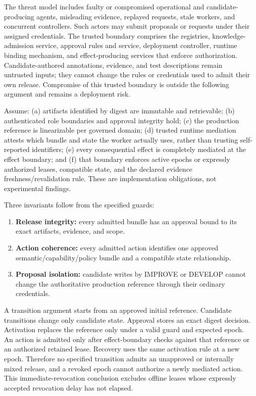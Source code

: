 \documentclass[preprint,12pt,authoryear]{elsarticle}
\providecommand{\tightlist}{\setlength{\itemsep}{0pt}\setlength{\parskip}{0pt}}
\begin{document}
The threat model includes faulty or compromised operational and
candidate-producing agents, misleading evidence, replayed requests,
stale workers, and concurrent controllers. Such actors may submit
proposals or requests under their assigned credentials. The trusted
boundary comprises the registries, knowledge-admission service, approval
rules and service, deployment controller, runtime binding mechanism, and
effect-producing services that enforce authorization. Candidate-authored
annotations, evidence, and test descriptions remain untrusted inputs;
they cannot change the rules or credentials used to admit their own
release. Compromise of this trusted boundary is outside the following
argument and remains a deployment risk.

Assume: (a) artifacts identified by digest are immutable and
retrievable; (b) authenticated role boundaries and approval integrity
hold; (c) the production reference is linearizable per governed domain;
(d) trusted runtime mediation attests which bundle and state the worker
actually uses, rather than trusting self-reported identifiers; (e) every
consequential effect is completely mediated at the effect boundary; and
(f) that boundary enforces active epochs or expressly authorized leases,
compatible state, and the declared evidence freshness/revalidation rule.
These are implementation obligations, not experimental findings.

Three invariants follow from the specified guards:

\begin{enumerate}
\def\labelenumi{\arabic{enumi}.}
\tightlist
\item
  \textbf{Release integrity:} every admitted bundle has an approval
  bound to its exact artifacts, evidence, and scope.
\item
  \textbf{Action coherence:} every admitted action identifies one
  approved semantic/capability/policy bundle and a compatible state
  relationship.
\item
  \textbf{Proposal isolation:} candidate writes by IMPROVE or DEVELOP
  cannot change the authoritative production reference through their
  ordinary credentials.
\end{enumerate}

A transition argument starts from an approved initial reference.
Candidate transitions change only candidate state. Approval stores an
exact digest decision. Activation replaces the reference only under a
valid guard and expected epoch. An action is admitted only after
effect-boundary checks against that reference or an authorized retained
lease. Recovery uses the same activation rule at a new epoch. Therefore
no specified transition admits an unapproved or internally mixed
release, and a revoked epoch cannot authorize a newly mediated action.
This immediate-revocation conclusion excludes offline leases whose
expressly accepted revocation delay has not elapsed.
\end{document}
